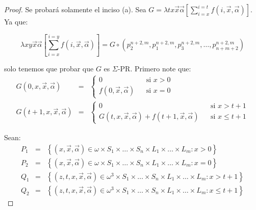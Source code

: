   \begin{proof}
    \PN Se probará solamente el inciso (a).
    \PN Sea $G = \lambda tx\vec{x}\vec{\alpha} \left[\sum_{i=x}^{i=t} f(i,\vec{x},\vec{\alpha})\right]$. Ya que:

    \[
      \lambda xy\vec{x}\vec{\alpha}\left[\sum_{i=x}^{i=y} f(i, \vec{x}, \vec{\alpha})\right] = G \circ \left(
      p_{2}^{n+2,m}, p_{1}^{n+2,m}, p_{3}^{n+2,m}, \dotsc, p_{n+m+2}^{n+2,m}\right)
    \]

    \PN solo tenemos que probar que $G$ es $\Sigma$-PR. Primero note que:
    \begin{eqnarray*}
      G(0,x,\vec{x},\vec{\alpha}) &=& \left\{
        \begin{array}{lll}
          0 && \text{si } x > 0 \\
          f(0,\vec{x},\vec{\alpha}) && \text{si } x = 0
        \end{array}\right. \\
      G(t+1,x,\vec{x},\vec{\alpha}) &=& \left\{
        \begin{array}{lll}
          0 && \text{si } x > t+1 \\
          G(t,x,\vec{x},\vec{\alpha}) + f(t+1,\vec{x},\vec{\alpha}) && \text{si } x \leq t+1
        \end{array} \right.
    \end{eqnarray*}

    \PN Sean:
    \begin{eqnarray*}
      P_{1} &=& \left\{(x,\vec{x},\vec{\alpha}) \in \omega \times S_{1} \times \dotsc \times S_{n} \times L_{1} \times
        \dotsc \times L_{m}: x > 0 \right\} \\
      P_{2} &=& \left\{(x,\vec{x},\vec{\alpha}) \in \omega \times S_{1} \times \dotsc \times S_{n} \times L_{1} \times
        \dotsc \times L_{m}: x = 0 \right\} \\
      Q_{1} &=& \left\{(z,t,x,\vec{x},\vec{\alpha}) \in \omega^{3} \times S_{1} \times \dotsc \times S_{n} \times L_{1}
        \times \dotsc \times L_{m}: x > t+1\right\} \\
      Q_{2} &=& \left\{(z,t,x,\vec{x},\vec{\alpha}) \in \omega^{3} \times S_{1} \times \dotsc \times S_{n} \times L_{1}
        \times \dotsc \times L_{m}: x \leq t+1\right\}
    \end{eqnarray*}


\end{proof}
